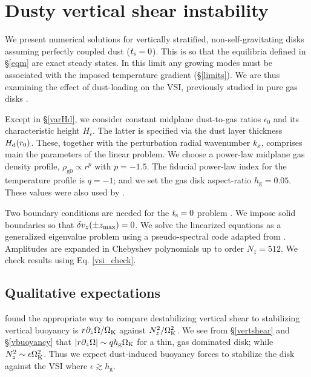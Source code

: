 \section{
  Dusty vertical shear instability}\label{results} 

We present numerical solutions for  
vertically stratified, non-self-gravitating disks assuming perfectly coupled dust 
($t_\mathrm{s}=0$). This is so that the equilibria defined in \S\ref{eqm} are exact
steady states. In this limit any growing modes must be associated with
the imposed temperature gradient (\S\ref{limits}). We are thus  
examining the effect of dust-loading on the VSI, previously studied in 
pure gas disks \citep[][ in this section]{lin15}. 

Except in  \S\ref{varHd}, we consider constant midplane
dust-to-gas ratios $\epsilon_0$ and its characteristic height
$H_\epsilon$. The latter is specified via the dust layer thickness
$H_\mathrm{d}(r_0)$. 
These, together with the perturbation radial wavenumber $k_x$, comprises main the
parameters of the linear problem. We choose a power-law 
midplane gas density profile, $\rho_\mathrm{g0}\propto r^p$ with $p =
-1.5$. The fiducial power-law index for the 
temperature profile is $q=-1$; and we set the gas disk aspect-ratio
$h_\mathrm{g}=0.05$. These values were also used by 
. 

Two boundary conditions are needed for the $t_\mathrm{s}=0$
problem \citep[e.g.][]{lubow93}. We impose solid boundaries so that
$\delta v_z(\pm z_\mathrm{max})=0$. We solve the linearized equations as a
generalized eigenvalue problem using a pseudo-spectral code adapted
from . Amplitudes are expanded in Chebyshev
polynomials up to order $N_z=512$. We check results using
Eq. \ref{vsi_check}.      

\subsection{Qualitative expectations}\label{vsi_est}
 found the appropriate way to compare 
destabilizing vertical shear to stabilizing vertical buoyancy is
$r\partial_z\Omega/\Omega_{\rm K}$ against $N_z^2/\Omega_{\rm K}^2$. We see from \S\ref{vertshear}
and \S\ref{vbuoyancy} that $|r\partial_z\Omega|\sim q h_\mathrm{g}\Omega_{\rm K}$ for a
thin, gas dominated disk; while $N_z^2\sim \epsilon\Omega_{\rm K}^2$. Thus we
expect dust-induced buoyancy forces to stabilize the disk against the
VSI where $\epsilon \gtrsim h_\mathrm{g}$. 


